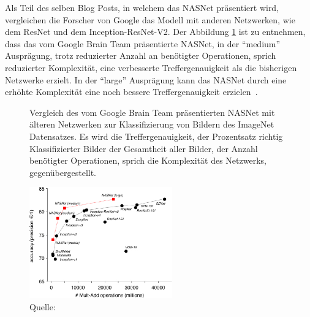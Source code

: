 Als Teil des selben Blog Posts, in welchem das NASNet präsentiert wird, vergleichen die Forscher von Google das Modell mit anderen Netzwerken, wie dem ResNet und dem Inception-ResNet-V2. Der Abbildung \ref{nasnet-comparision} ist zu entnehmen, dass das vom Google Brain Team präsentierte NASNet, in der \enquote{medium} Ausprägung, trotz reduzierter Anzahl an benötigter Operationen, sprich reduzierter Komplexität, eine verbesserte Treffergenauigkeit als die bisherigen Netzwerke erzielt. In der \enquote{large} Ausprägung kann das NASNet durch eine erhöhte Komplexität eine noch bessere Treffergenauigkeit erzielen~\autocite{GoogleNasNet}.

\begin{figure}[h]
    \captionsetup{width=.9\linewidth}
    \caption[Vergleich des NASNet mit anderen Netzwerken zur Klassifizierung von Bildern]{Vergleich des vom Google Brain Team präsentierten NASNet mit älteren Netzwerken zur Klassifizierung von Bildern des ImageNet Datensatzes. Es wird die Treffergenauigkeit, der Prozentsatz richtig Klassifizierter Bilder der Gesamtheit aller Bilder, der Anzahl benötigter Operationen, sprich die Komplexität des Netzwerks, gegenübergestellt.}
    \label{nasnet-comparision}
    \centering
    \includegraphics[width=0.55\textwidth]{graphics/nasnet-comparision.jpg}
    \caption*{Quelle: \textcite{GoogleNasNet}}
\end{figure}


